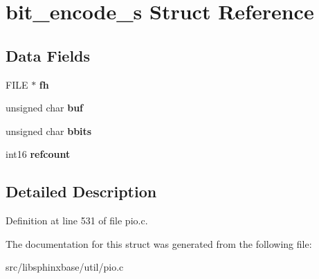 \section{bit\-\_\-encode\-\_\-s \-Struct \-Reference}
\label{structbit__encode__s}
\subsection*{\-Data \-Fields}
\begin{DoxyCompactItemize}
\item 
\-F\-I\-L\-E $\ast$ {\bfseries fh}\label{structbit__encode__s_af0c1de2333ec798aa832e762f4ee9887}

\item 
unsigned char {\bfseries buf}\label{structbit__encode__s_af068f9ee3624aed0b0c8720d579d2c7b}

\item 
unsigned char {\bfseries bbits}\label{structbit__encode__s_a69d53d4800481f63b0c2b990472323f8}

\item 
int16 {\bfseries refcount}\label{structbit__encode__s_af2862417e58a196618593631fc5e9833}

\end{DoxyCompactItemize}


\subsection{\-Detailed \-Description}


\-Definition at line 531 of file pio.\-c.



\-The documentation for this struct was generated from the following file\-:\begin{DoxyCompactItemize}
\item 
src/libsphinxbase/util/pio.\-c\end{DoxyCompactItemize}
